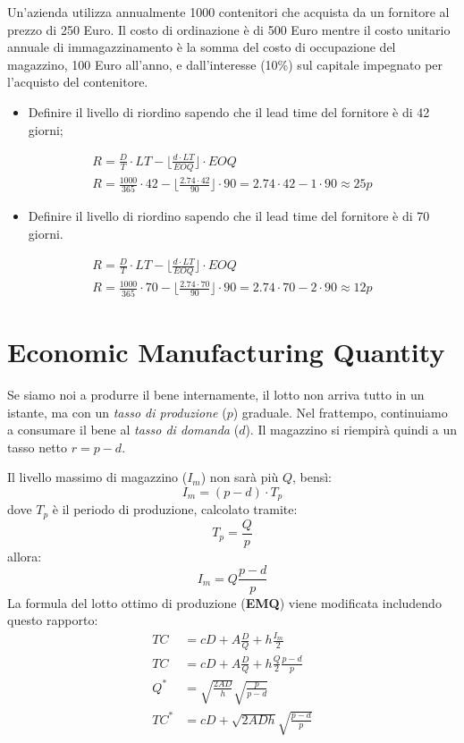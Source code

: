 \begin{example}
    Un'azienda utilizza annualmente 1000 contenitori che acquista da un
    fornitore al prezzo di 250 Euro. Il costo di ordinazione è di 500 Euro mentre il costo unitario annuale di immagazzinamento è la somma del costo di occupazione del magazzino, 100 Euro all'anno, e dall'interesse (10\%) sul capitale impegnato per l'acquisto del contenitore.
    \begin{itemize}
        \item Definire il livello di riordino sapendo che il lead time del fornitore è di 42 giorni;
    \end{itemize}
    \begin{gather*}
        R = \frac{D}{T} \cdot LT - \lfloor \frac{d \cdot LT}{EOQ} \rfloor \cdot EOQ \\
        R = \frac{1000}{365} \cdot 42 - \lfloor \frac{2.74 \cdot 42}{90} \rfloor \cdot 90 = 2.74 \cdot 42 - 1 \cdot 90 \approx 25 \si{p}
    \end{gather*}
    \begin{itemize}
        \item Definire il livello di riordino sapendo che il lead time del fornitore è di 70 giorni.
    \end{itemize}
    \begin{gather*}
        R = \frac{D}{T} \cdot LT - \lfloor \frac{d \cdot LT}{EOQ} \rfloor \cdot EOQ \\
        R = \frac{1000}{365} \cdot 70 - \lfloor \frac{2.74 \cdot 70}{90} \rfloor \cdot 90 = 2.74 \cdot 70 - 2 \cdot 90 \approx 12 \si{p}
    \end{gather*}
\end{example}

%
\section{Economic Manufacturing Quantity}
Se siamo noi a produrre il bene internamente, il lotto non arriva tutto in un istante, ma con un \emph{tasso di produzione} ($p$) graduale. Nel frattempo, continuiamo a consumare il bene al \emph{tasso di domanda} ($d$). Il magazzino si riempirà quindi a un tasso netto $r = p - d$.

Il livello massimo di magazzino ($I_m$) non sarà più $Q$, bensì:
\[
    I_m = (p-d) \cdot T_{p}
\]
dove $ T_{p} $ è il periodo di produzione, calcolato tramite:
\[
    T_{p} = \frac{Q}{p}
\]
allora:
\[
    I_{m} = Q \frac{p-d}{p}
\]
La formula del lotto ottimo di produzione (\textbf{EMQ}) viene modificata includendo questo rapporto:
\begin{align*}
    TC     & = cD + A \frac{D}{Q} + h \frac{I_{m}}{2}           \\
    TC     & = cD + A \frac{D}{Q} + h \frac{Q}{2} \frac{p-d}{p} \\
    Q^{*}  & = \sqrt{\frac{2AD}{h}} \sqrt{\frac{p}{p-d}}        \\
    TC^{*} & = cD + \sqrt{2ADh} \sqrt{\frac{p-d}{p}}
\end{align*}


